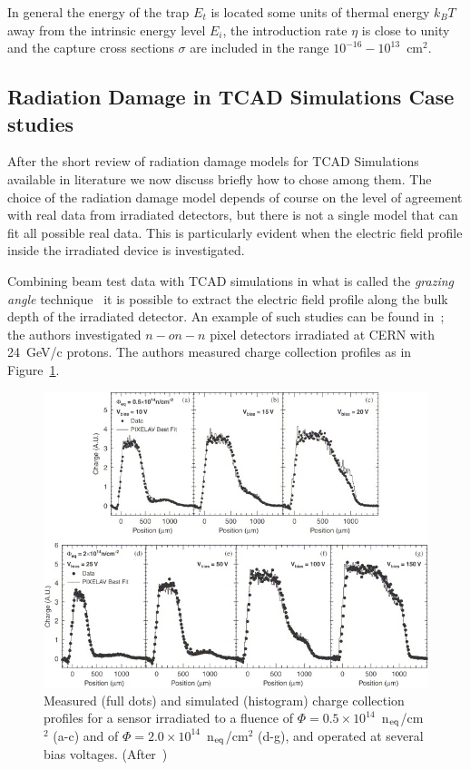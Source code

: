In general the energy of the trap $E_t$ is located some units of thermal energy $k_B T$ away from the 
intrinsic energy level $E_i$, the introduction rate $\eta$ is close to unity and the 
capture cross sections $\sigma$ are included in the range $10^{-16}-10^{13}$~cm$^2$.

\subsection{Radiation Damage in TCAD Simulations Case studies}
\label{sec:Savic}

After the short review of radiation damage models for TCAD Simulations available in literature 
we now discuss briefly how to chose among them.
The choice of the radiation damage model depends of course 
on the level of agreement with real data from irradiated detectors, but there is not a single model 
that can fit all possible real data. This is particularly evident when the electric field profile inside 
the irradiated device is investigated. 

Combining beam test data with TCAD simulations in what is called the {\it grazing angle} 
technique~\cite{Henrich:687041,Lari:2001qqa,LARI2004349}  
it is possible to extract the electric field profile along the bulk depth of the irradiated detector.
An example of such studies can be found in~\cite{Chiochia2005,CHIOCHIA2006}; the 
authors investigated $n-on-n$ pixel detectors irradiated at CERN with  24~GeV/c protons. 
The authors measured charge collection profiles as in Figure~\ref{fig:chiochia2006_profiles}. 

\begin{figure}[!htpb]
\centering
\includegraphics[width=1.00\textwidth]{chiochia2006_profiles.jpg}
\caption{\label{fig:chiochia2006_profiles}Measured (full dots) and simulated (histogram) charge collection profiles for a sensor irradiated to a fluence of $\Phi = 0.5\times10^{14}$~n$_{\rm eq}$/cm$^2$  (a-c) and of $\Phi = 2.0\times10^{14}$~n$_{\rm eq}$/cm$^2$  (d-g), and operated at several bias voltages. (After~\cite{CHIOCHIA2006})}
\end{figure}


